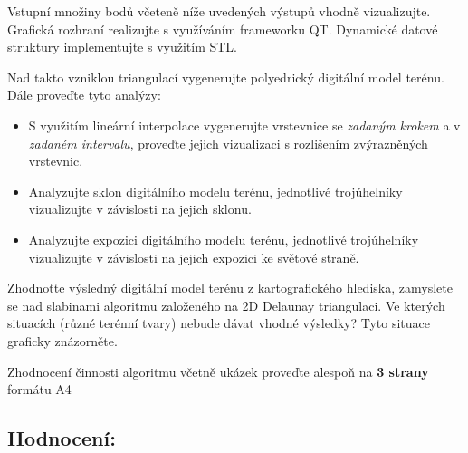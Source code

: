 \documentclass[9pt, a4paper]{article}
\begin{document}
\noindent Vstupní množiny bodů včeteně níže uvedených výstupů vhodně vizualizujte. Grafická rozhraní realizujte s využíváním frameworku QT. Dynamické datové struktury implementujte s využitím STL. 
\vspace{3mm}

\noindent Nad takto vzniklou triangulací vygenerujte polyedrický digitální model terénu. Dále proveďte tyto analýzy:
\vspace{3mm}

\begin{itemize}
    \item S využitím lineární interpolace vygenerujte vrstevnice se \textit{zadaným krokem} a v \textit{zadaném intervalu}, proveďte jejich vizualizaci s rozlišením zvýrazněných vrstevnic.
    \item Analyzujte sklon digitálního modelu terénu, jednotlivé trojúhelníky vizualizujte v závislosti na jejich sklonu.
    \item Analyzujte expozici digitálního modelu terénu, jednotlivé trojúhelníky vizualizujte v závislosti na jejich expozici ke světové straně.
\end{itemize}
\vspace{3mm}

\noindent Zhodnoťte výsledný digitální model terénu z kartografického hlediska, zamyslete se nad slabinami algoritmu založeného na 2D Delaunay triangulaci. Ve kterých situacích (různé terénní tvary) nebude dávat vhodné výsledky? Tyto situace graficky znázorněte.
\vspace{3mm}

\noindent Zhodnocení činnosti algoritmu včetně ukázek proveďte alespoň na \textbf{3 strany} formátu A4 

\vspace{0.3cm}
\subsection*{\textbf{Hodnocení:}}
\end{document}
